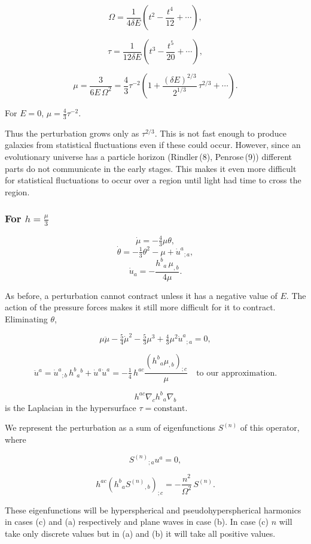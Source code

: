 \[
\Omega = \frac{1}{4\delta E}\left(t^{2} - \frac{t^{4}}{12} + \cdots \right),
\]

\[
\tau = \frac{1}{12\delta E}\left(t^{3} - \frac{t^{5}}{20} + \cdots \right),
\]

\[
\mu = \frac{3}{6E\,\Omega^{2}} = \frac{4}{3}\tau^{-2}
     \left(1 + \frac{(\delta E)^{2/3}}{2^{1/3}}\,\tau^{2/3} + \cdots \right).
\]

For $E=0$, \quad $\mu = \tfrac{4}{3}\tau^{-2}$.

Thus the perturbation grows only as $\tau^{2/3}$.  
This is not fast enough to produce galaxies from statistical fluctuations 
even if these could occur. However, since an evolutionary universe has 
a particle horizon (Rindler\,(8), Penrose\,(9)) different parts do not 
communicate in the early stages. This makes it even more difficult for 
statistical fluctuations to occur over a region until light had time 
to cross the region.

\subsubsection*{For $h = \tfrac{\mu}{3}$}

\[
\dot{\mu} = -\tfrac{4}{3}\mu\theta,
\]
\[
\dot{\theta} = -\tfrac{1}{3}\theta^{2} - \mu + \dot{u}^{a}{}_{;a},
\]
\[
\dot{u}_{a} = -\frac{h^{b}{}_{a}\,\mu_{,b}}{4\mu}.
\]

As before, a perturbation cannot contract unless it has a negative 
value of $E$. The action of the pressure forces makes it still more 
difficult for it to contract. Eliminating $\theta$,

\[
\mu \ddot{\mu} - \tfrac{5}{4}\dot{\mu}^{2} - \tfrac{5}{3}\mu^{3} + \tfrac{4}{3}\mu^{2}\dot{u}^{a}{}_{;a} = 0,
\]

\[
\ddot{u}^{a} = \dot{u}^{a}{}_{;b}\,h^{b}{}_{a}{}^{b} + \dot{u}^{a}\dot{u}^{a}
= -\tfrac{1}{4}\,h^{ac}\frac{(h^{b}{}_{a}\mu_{,b})_{;c}}{\mu}
\quad \text{to our approximation.}
\]

\[
h^{ac}\nabla_{c} h^{b}{}_{a}\nabla_{b}
\]
is the Laplacian in the hypersurface $\tau = \text{constant}$.  

We represent the perturbation as a sum of eigenfunctions $S^{(n)}$ of 
this operator, where  

\[
S^{(n)}{}_{;a}u^{a} = 0,
\]

\[
h^{ac}(h^{b}{}_{a}S^{(n)}{}_{,b})_{;c} 
= -\frac{n^{2}}{\Omega^{2}}\,S^{(n)}.
\]

These eigenfunctions will be hyperspherical and pseudohyperspherical 
harmonics in cases (c) and (a) respectively and plane waves in case (b).  
In case (c) $n$ will take only discrete values but in (a) and (b) it will take all positive values.

